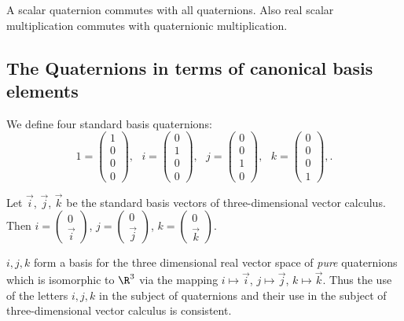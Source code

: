 \documentclass[oneside,12pt]{amsart}
\begin{document}
\begin{corollary}
\label{corollary:scalars_commute}
A scalar quaternion commutes with all quaternions.
Also real scalar multiplication commutes with quaternionic multiplication.
\end{corollary}

\subsection{The Quaternions in terms of canonical basis elements}

We define four standard basis quaternions:
$$
1 = \begin{pmatrix}1\\0\\0\\0\end{pmatrix},\text{  }
i =  \begin{pmatrix}0\\1\\0\\0\end{pmatrix},\text{  }
j =  \begin{pmatrix}0\\0\\1\\0\end{pmatrix},\text{  }
k =  \begin{pmatrix}0\\0\\0\\1\end{pmatrix},\text{.}
$$

\begin{note}
Let $\vec{i}$, $\vec{j}$, $\vec{k}$ be the standard basis vectors of three-dimensional vector calculus.
Then
$i = \begin{pmatrix}0\\\vec{i}\end{pmatrix}$, 
$j = \begin{pmatrix}0\\\vec{j}\end{pmatrix}$, 
$k = \begin{pmatrix}0\\\vec{k}\end{pmatrix}$.
\end{note}

\begin{note}
$i,j,k$ form a basis for the three dimensional real vector
space of \emph{pure} quaternions which is isomorphic to $\R^3$ via
the mapping $i\mapsto \vec{i}$, $j\mapsto\vec{j}$, $k\mapsto\vec{k}$.
Thus the use of the letters $i,j,k$ in the subject of quaternions and
their use in the subject of three-dimensional vector calculus is consistent.
\end{note}
\end{document}

